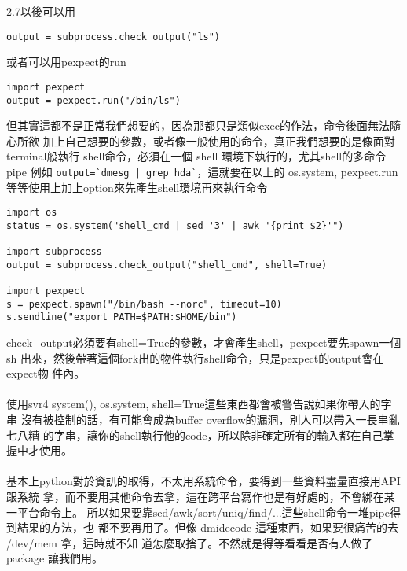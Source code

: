   2.7以後可以用
  \begin{verbatim}
output = subprocess.check_output("ls")
  \end{verbatim}
  或者可以用pexpect的run
  \begin{verbatim}
import pexpect
output = pexpect.run("/bin/ls")
  \end{verbatim}
  但其實這都不是正常我們想要的，因為那都只是類似exec的作法，命令後面無法隨心所欲
  加上自己想要的參數，或者像一般使用的命令，真正我們想要的是像面對terminal般執行
  shell命令，必須在一個 shell 環境下執行的，尤其shell的多命令 pipe 例如 
  \verb-output=`dmesg | grep hda`-，這就要在以上的 os.system, pexpect.run 
  等等使用上加上option來先產生shell環境再來執行命令
  \begin{verbatim}
import os
status = os.system("shell_cmd | sed '3' | awk '{print $2}'")

import subprocess
output = subprocess.check_output("shell_cmd", shell=True)

import pexpect
s = pexpect.spawn("/bin/bash --norc", timeout=10)
s.sendline("export PATH=$PATH:$HOME/bin")
  \end{verbatim}
  check\_output必須要有shell=True的參數，才會產生shell，pexpect要先spawn一個sh
  出來，然後帶著這個fork出的物件執行shell命令，只是pexpect的output會在expect物
  件內。
  \\\\
  使用svr4 system(), os.system, shell=True這些東西都會被警告說如果你帶入的字串
  沒有被控制的話，有可能會成為buffer overflow的漏洞，別人可以帶入一長串亂七八糟
  的字串，讓你的shell執行他的code，所以除非確定所有的輸入都在自己掌握中才使用。
  \\\\
  基本上python對於資訊的取得，不太用系統命令，要得到一些資料盡量直接用API跟系統
  拿，而不要用其他命令去拿，這在跨平台寫作也是有好處的，不會綁在某一平台命令上。
  所以如果要靠sed/awk/sort/uniq/find/...這些shell命令一堆pipe得到結果的方法，也
  都不要再用了。但像 dmidecode 這種東西，如果要很痛苦的去 /dev/mem 拿，這時就不知
  道怎麼取捨了。不然就是得等看看是否有人做了 package 讓我們用。

